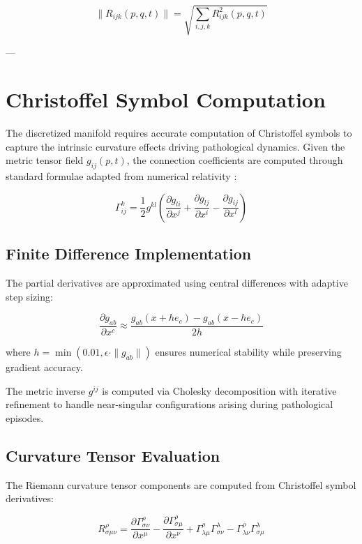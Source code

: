 \begin{equation}
\|R_{ijk}(p,q,t)\| = \sqrt{\sum_{i,j,k} R_{ijk}^2(p,q,t)}
\end{equation}

---

\section{Christoffel Symbol Computation}

The discretized manifold requires accurate computation of Christoffel symbols to capture the intrinsic curvature effects driving pathological dynamics. Given the metric tensor field $g_{ij}(p,t)$, the connection coefficients are computed through standard formulae adapted from numerical relativity \autocite{BaumgarteShapiro2010}:

\begin{equation}
\Gamma^k_{ij} = \frac{1}{2} g^{kl}\left(\frac{\partial g_{li}}{\partial x^j} + \frac{\partial g_{lj}}{\partial x^i} - \frac{\partial g_{ij}}{\partial x^l}\right)
\end{equation}

\subsection{Finite Difference Implementation}

The partial derivatives are approximated using central differences with adaptive step sizing:

\begin{equation}
\frac{\partial g_{ab}}{\partial x^c} \approx \frac{g_{ab}(x + h e_c) - g_{ab}(x - h e_c)}{2h}
\end{equation}

where $h = \min(0.01, \epsilon \cdot \|g_{ab}\|)$ ensures numerical stability while preserving gradient accuracy.

The metric inverse $g^{ij}$ is computed via Cholesky decomposition with iterative refinement to handle near-singular configurations arising during pathological episodes.

\subsection{Curvature Tensor Evaluation}

The Riemann curvature tensor components are computed from Christoffel symbol derivatives:

\begin{equation}
R^{\rho}_{\sigma\mu\nu} = \frac{\partial \Gamma^{\rho}_{\sigma\nu}}{\partial x^{\mu}} - \frac{\partial \Gamma^{\rho}_{\sigma\mu}}{\partial x^{\nu}} + \Gamma^{\rho}_{\lambda\mu}\Gamma^{\lambda}_{\sigma\nu} - \Gamma^{\rho}_{\lambda\nu}\Gamma^{\lambda}_{\sigma\mu}
\end{equation}


